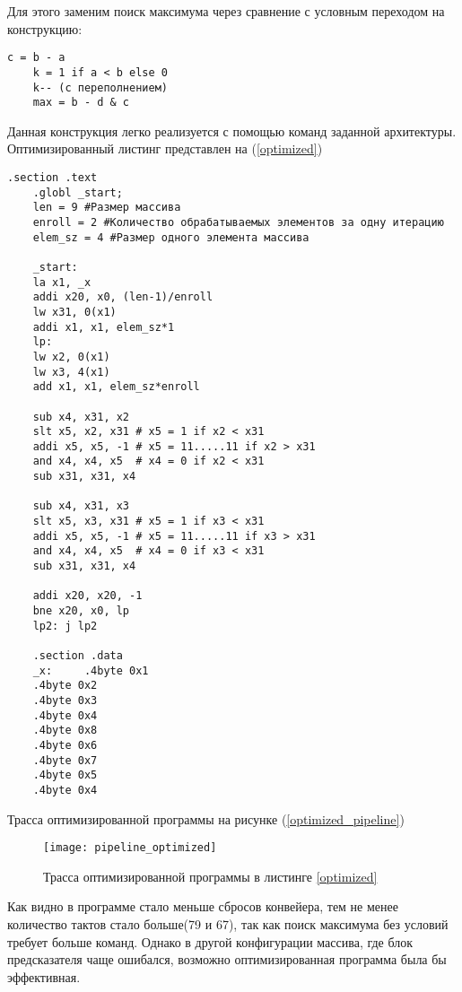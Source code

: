 Для этого заменим поиск максимума через сравнение с условным переходом на конструкцию:

\begin{lstlisting}[label=max,caption={Поиск максимума через логические и арифметические операции.}]
	c = b - a
	k = 1 if a < b else 0
	k-- (с переполнением)
	max = b - d & c
\end{lstlisting}

Данная конструкция легко реализуется с помощью команд заданной архитектуры. Оптимизированный листинг представлен на (\ref{optimized})

\begin{lstlisting}[label=optimized,caption={Оптимизированная программа по варианту}]
  .section .text
	.globl _start;
	len = 9 #Размер массива
	enroll = 2 #Количество обрабатываемых элементов за одну итерацию
	elem_sz = 4 #Размер одного элемента массива
	
	_start:
	la x1, _x
	addi x20, x0, (len-1)/enroll
	lw x31, 0(x1)
	addi x1, x1, elem_sz*1
	lp:
	lw x2, 0(x1)
	lw x3, 4(x1)
	add x1, x1, elem_sz*enroll
	
	sub x4, x31, x2
	slt x5, x2, x31 # x5 = 1 if x2 < x31
	addi x5, x5, -1 # x5 = 11.....11 if x2 > x31
	and x4, x4, x5  # x4 = 0 if x2 < x31
	sub x31, x31, x4
	
	sub x4, x31, x3
	slt x5, x3, x31 # x5 = 1 if x3 < x31
	addi x5, x5, -1 # x5 = 11.....11 if x3 > x31
	and x4, x4, x5  # x4 = 0 if x3 < x31
	sub x31, x31, x4
	
	addi x20, x20, -1
	bne x20, x0, lp
	lp2: j lp2
	
	.section .data
	_x:     .4byte 0x1
	.4byte 0x2
	.4byte 0x3
	.4byte 0x4
	.4byte 0x8
	.4byte 0x6
	.4byte 0x7
	.4byte 0x5
	.4byte 0x4
\end{lstlisting}

Трасса оптимизированной программы на рисунке (\ref{optimized_pipeline})

\begin{figure}[h]
	\centering
	\texttt{[image: pipeline\_optimized]}
	\caption{Трасса оптимизированной программы в листинге \ref{optimized}}
	\label{fig:optimized_pipeline}
\end{figure}

Как видно в программе стало меньше сбросов конвейера, тем не менее количество тактов стало больше(79 и 67), так как поиск максимума без условий требует больше команд. Однако в другой конфигурации массива, где блок предсказателя чаще ошибался, возможно оптимизированная программа была бы эффективная.

\clearpage

